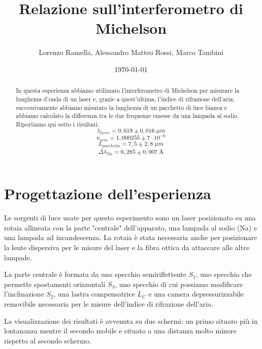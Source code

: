 \documentclass{article}
\title{Relazione sull'interferometro di Michelson}
\author{Lorenzo Ramella, Alessandro Matteo Rossi, Marco Tambini}
\date{\today}
\begin{document}
\maketitle

\begingroup
{}
\begin{abstract}
In questa esperienza abbiamo utilizzato l'interferometro di Michelson per misurare la lunghezza d'onda di un laser e, grazie a quest'ultima, l'indice di rifrazione dell'aria; successivamente abbiamo misurato la lunghezza di un pacchetto di luce bianca e abbiamo calcolato la differenza tra le due frequenze emesse da una lampada al sodio.
Riportiamo qui sotto i risultati:
\[ \lambda_{laser} = 0,619 \pm 0,016 \; \mu m \]
\[ n_{aria} = 1,000255 \pm 7 \cdot 10^{-6} \]
\[ L_{pacchetto} = 7,5 \pm 2,8 \; \mu m \]
\[ \Delta \lambda_{Na} = 6,285 \pm 0,007 \; \textrm{Å} \]
\end{abstract}
\endgroup

\tableofcontents



\section{Progettazione dell'esperienza}
Le sorgenti di luce usate per questo esperimento sono un laser posizionato su una rotaia allineata con la parte "centrale" dell'apparato, una lampada al sodio (Na) e una lampada ad incandescenza. La rotaia è stata necessaria anche per posizionare la lente dispersiva per le misure del laser e la fibra ottica da attaccare alle altre lampade.

\vspace{3mm}

La parte centrale è formata da uno specchio semiriflettente $S_1$, uno specchio che permette spostamenti orizzontali $S_3$, uno specchio di cui possiamo modificare l'inclinazione $S_2$, una lastra compensatrice $L_C$ e una camera depressurizzabile removibile necessaria per le misure dell'indice di rifrazione dell'aria. 

\vspace{3mm}

La visualizzazione dei risultati è avvenuta su due schermi: un primo situato più in lontananza mentre il secondo mobile e situato a una distanza molto minore rispetto al secondo schermo.

\vspace{2mm}
\end{document}
